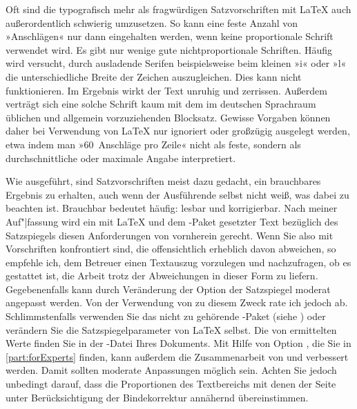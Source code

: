 Oft sind die typografisch mehr als fragwürdigen Satzvorschriften mit {\LaTeX}
auch außerordentlich schwierig umzusetzen. So kann eine feste Anzahl von
»Anschlägen« nur dann eingehalten werden, wenn keine proportionale Schrift
verwendet wird. Es gibt nur wenige gute nichtproportionale Schriften.
\iffalse %
Kaum ein Text, der mit einer derartigen Schrift gesetzt ist, wirkt
gleichmäßig. So wird häufig %
\else Häufig wird %
\fi %
versucht, durch ausladende Serifen beispielsweise beim kleinen »i« oder »l«
die unterschiedliche Breite der Zeichen auszugleichen. Dies kann nicht
funktionieren. Im Ergebnis wirkt der Text unruhig und zerrissen. Außerdem
verträgt sich eine solche Schrift kaum mit dem im deutschen Sprachraum
üblichen und allgemein vorzuziehenden Blocksatz. Gewisse Vorgaben können daher
bei Verwendung von {\LaTeX} nur ignoriert oder großzügig ausgelegt werden,
etwa indem man »60~Anschläge pro Zeile« nicht als feste, sondern als
durchschnittliche oder maximale Angabe interpretiert.

Wie ausgeführt, sind Satzvorschriften meist dazu gedacht, ein brauchbares
Ergebnis zu erhalten, auch wenn der Ausführende selbst nicht weiß, was dabei
zu beachten ist. Brauchbar bedeutet häufig: lesbar und korrigierbar. Nach
meiner Auf"|fassung wird ein mit {\LaTeX} und dem -Paket
gesetzter Text bezüglich des Satzspiegels diesen Anforderungen von vornherein
gerecht. Wenn Sie also mit Vorschriften konfrontiert sind, die offensichtlich
erheblich davon abweichen, so empfehle ich, dem Betreuer einen Textauszug
vorzulegen und nachzufragen, ob es gestattet ist, die Arbeit trotz der
Abweichungen in dieser Form zu liefern. Gegebenenfalls kann durch Veränderung
der Option
 der
Satzspiegel moderat angepasst werden. Von der Verwendung von
 zu diesem Zweck rate ich jedoch
ab. Schlimmstenfalls verwenden Sie das nicht zu {\KOMAScript} gehörende
-Paket
(siehe \cite{package:geometry}) oder verändern Sie die Satzspiegelparameter
von {\LaTeX} selbst. Die von  ermittelten Werte finden Sie
in der -Datei Ihres Dokuments. Mit Hilfe von Option
%
, die Sie in
\autoref{part:forExperts} finden, kann außerdem die Zusammenarbeit von
 und  verbessert werden. Damit sollten
moderate Anpassungen möglich sein. Achten Sie jedoch unbedingt darauf, dass
die Proportionen des Textbereichs mit denen der Seite unter Berücksichtigung
der Bindekorrektur annähernd übereinstimmen.

